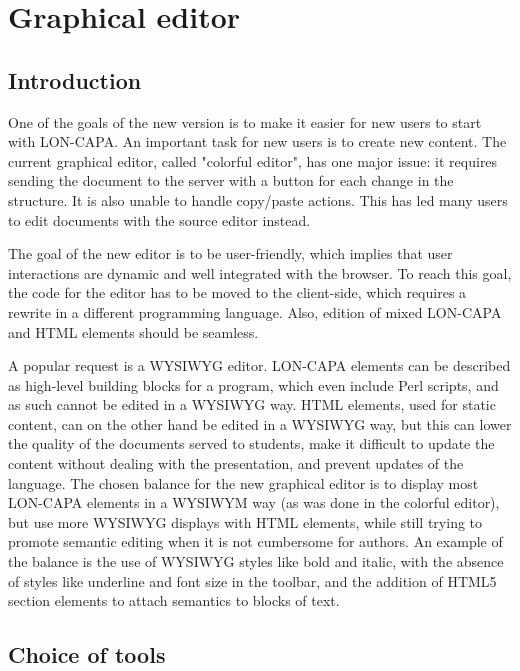 \chapter{Graphical editor}

\section{Introduction}

One of the goals of the new version is to make it easier for new users to start with LON-CAPA. An important task for new users is to create new content. The current graphical editor, called "colorful editor", has one major issue: it requires sending the document to the server with a button for each change in the structure. It is also unable to handle copy/paste actions. This has led many users to edit documents with the source editor instead.

The goal of the new editor is to be user-friendly, which implies that user interactions are dynamic and well integrated with the browser. To reach this goal, the code for the editor has to be moved to the client-side, which requires a rewrite in a different programming language. Also, edition of mixed LON-CAPA and HTML elements should be seamless.

A popular request is a WYSIWYG editor. LON-CAPA elements can be described as high-level building blocks for a program, which even include Perl scripts, and as such cannot be edited in a WYSIWYG way. HTML elements, used for static content, can on the other hand be edited in a WYSIWYG way, but this can lower the quality of the documents served to students, make it difficult to update the content without dealing with the presentation, and prevent updates of the language. The chosen balance for the new graphical editor is to display most LON-CAPA elements in a WYSIWYM way (as was done in the colorful editor), but use more WYSIWYG displays with HTML elements, while still trying to promote semantic editing when it is not cumbersome for authors.
An example of the balance is the use of WYSIWYG styles like bold and italic, with the absence of styles like underline and font size in the toolbar, and the addition of HTML5 section elements to attach semantics to blocks of text.


\section{Choice of tools}

